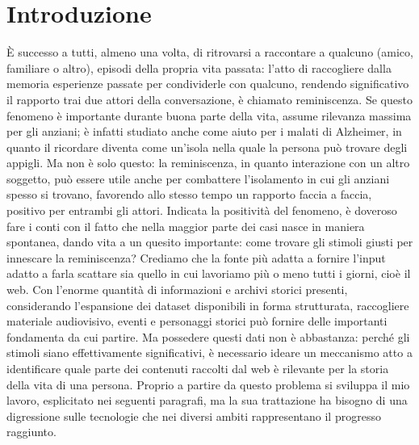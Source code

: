 \section{Introduzione}
\`{E} successo a tutti, almeno una volta, di ritrovarsi a raccontare a qualcuno (amico, familiare o altro), episodi della propria vita passata: l’atto di raccogliere dalla memoria esperienze passate per condividerle con qualcuno, rendendo significativo il rapporto trai due attori della conversazione, \`{e} chiamato reminiscenza. Se questo fenomeno è importante durante buona parte della vita, assume rilevanza massima per gli anziani; \`{e} infatti studiato anche come aiuto per i malati di Alzheimer, in quanto il ricordare diventa come un’isola nella quale la persona può trovare degli appigli. Ma non \`{e} solo questo: la reminiscenza, in quanto interazione con un altro soggetto, può essere utile anche per combattere l’isolamento in cui gli anziani spesso si trovano, favorendo allo stesso tempo un rapporto faccia a faccia, positivo per entrambi gli attori.
Indicata la positività del fenomeno, \`{e} doveroso fare i conti con il fatto che nella maggior parte dei casi nasce in maniera spontanea, dando vita a un quesito importante: come trovare gli stimoli giusti per innescare la reminiscenza? Crediamo che la fonte più adatta a fornire l’input adatto a farla scattare sia quello in cui lavoriamo più o meno tutti i giorni, cio\`{e} il web. Con l’enorme quantità di informazioni e archivi storici presenti, considerando l’espansione dei dataset disponibili in forma strutturata, raccogliere materiale audiovisivo, eventi e personaggi storici può fornire delle importanti fondamenta da cui partire.
Ma possedere questi dati non \`{e} abbastanza: perch\'{e} gli stimoli siano effettivamente significativi, \`{e} necessario ideare un meccanismo atto a identificare quale parte dei contenuti raccolti dal web \`{e} rilevante per la storia della vita di una persona. Proprio a partire da questo problema si sviluppa il mio lavoro, esplicitato nei seguenti paragrafi, ma la sua trattazione ha bisogno di una digressione sulle tecnologie che nei diversi ambiti rappresentano il progresso raggiunto.